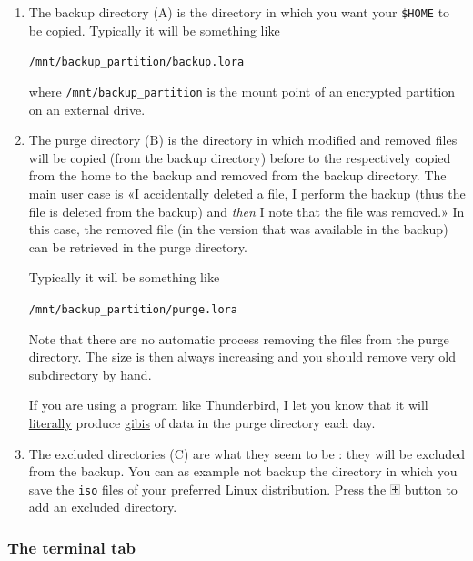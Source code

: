 \documentclass[a4paper,12pt]{article}
\newcommand{\info}[1]{\texttt{#1}}
\begin{document}
\begin{enumerate}
    \item
        The backup directory (A) is the directory in which you want your \info{\$HOME} to be copied. Typically it will be something like
        \begin{center}
            \info{/mnt/backup\_partition/backup.lora}
        \end{center}
        where \info{/mnt/backup\_partition} is the mount point of an encrypted partition on an external drive.
    \item
        The purge directory (B) is the directory in which modified and removed files will be copied (from the backup directory) before to the respectively copied from the home to the backup and removed from the backup directory. The main user case is «I accidentally deleted a file, I perform the backup (thus the file is deleted from the backup) and \emph{then} I note that the file was removed.»  In this case, the removed file (in the version that was available in the backup) can be retrieved in the purge directory.

        Typically it will be something like
        \begin{center}
            \info{/mnt/backup\_partition/purge.lora}
        \end{center}

        Note that there are no automatic process removing the files from the purge directory. The size is then always increasing and you should remove very old subdirectory by hand.

        If you are using a program like Thunderbird, I let you know that it will \href{ http://xkcd.com/725/ }{ literally} produce \href{ https://fr.wikipedia.org/wiki/Gibioctet }{gibis} of data in the purge directory each day.
    \item
        The excluded directories (C) are what they seem to be : they will be excluded from the backup. You can as example not backup the directory in which you save the \info{iso} files of your preferred Linux distribution. Press the \includegraphics{plus.png} button to add an excluded directory.
\end{enumerate}

\subsubsection{The terminal tab}
\end{document}
